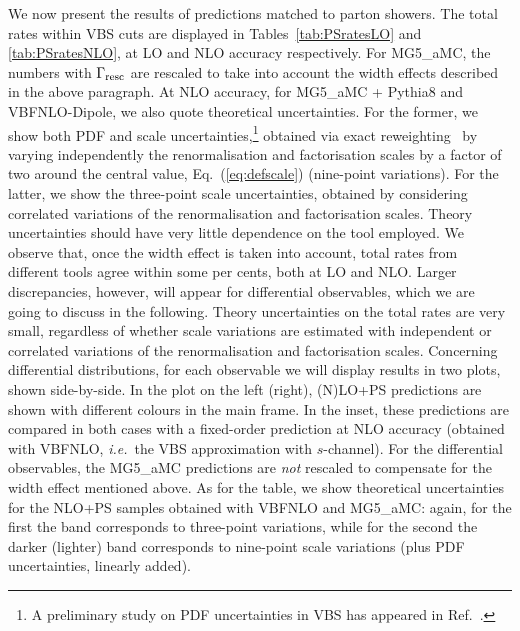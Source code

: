 \documentclass[twocolumn,epjc3]{svjour3} %
\newlength{\width}
\begin{document}
We now present the results of predictions matched to parton showers.
The total rates within VBS cuts are displayed in Tables~\ref{tab:PSratesLO} and
\ref{tab:PSratesNLO}, at LO and NLO
accuracy respectively. For {\sc MG5\_aMC},
the numbers with $\Gamma_{\rm resc}$ are rescaled to
take into account the width effects described in the above paragraph. At NLO accuracy, for {\sc MG5\_aMC} + {\sc Pythia8} and {\sc VBFNLO}-{\sc Dipole}, we also quote
theoretical uncertainties.
For the former, we show both PDF and scale uncertainties,\footnote{A preliminary study on PDF uncertainties in VBS has appeared
in Ref.~\cite{Schwan:2017yy}.} obtained via exact reweighting~\cite{Frederix:2011ss} by varying independently the renormalisation and factorisation
scales by a factor of two around the central value, Eq.~(\ref{eq:defscale}) (nine-point variations).
For the latter, we show the
three-point scale uncertainties, obtained by considering correlated variations of the renormalisation and factorisation scales. Theory uncertainties should have very little dependence on the tool employed.
We observe that, once the width effect is taken into
account, total rates from different tools agree within some per cents, both at LO and NLO. Larger discrepancies, however, will appear for differential observables, which we are going to discuss in
the following. Theory uncertainties on the total rates are very small, regardless of whether scale variations are estimated with 
independent or correlated variations of the renormalisation and factorisation scales.
Concerning differential distributions, for each observable we will display results in two plots, shown side-by-side. In the plot on the left (right), (N)LO+PS predictions are shown
with different colours in the main frame. In the inset, these predictions are compared in both cases with a fixed-order prediction at NLO accuracy (obtained with
{\sc VBFNLO}, \emph{i.e.}\ the VBS approximation with $s$-channel).
For the differential observables, the {\sc MG5\_aMC} predictions are \emph{not} rescaled to compensate for the width effect mentioned above. As for the table, we show theoretical uncertainties for the NLO+PS samples
obtained with {\sc VBFNLO} and {\sc MG5\_aMC}:
again, for the first the band corresponds to three-point variations, while for the second the darker (lighter) band corresponds to nine-point
scale variations (plus PDF uncertainties, linearly added).
\end{document}
